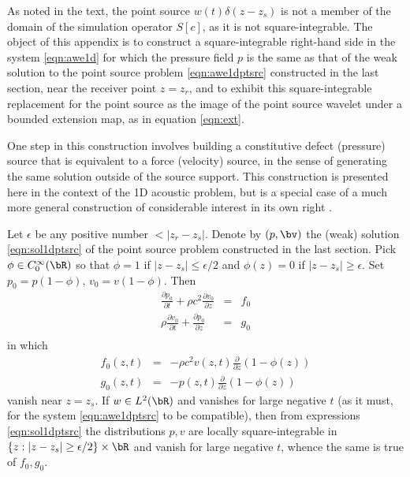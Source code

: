 
As noted in the text, the point source $w(t)\delta(z-z_s)$ is not a
member of the domain of the simulation operator $S[c]$, as it is not
square-integrable. The object of this appendix is to construct a square-integrable right-hand side in the
system \ref{eqn:awe1d} for which the pressure field $p$
is the same as that of the weak solution to the point source problem \ref{eqn:awe1dptsrc}
constructed in the last section, near the receiver point $z=z_r$, and
to exhibit this square-integrable replacement for the point source as
the image of the point source wavelet under a bounded extension map,
as in equation \ref{eqn:ext}.

One step in this construction involves building a constitutive defect
(pressure) source that is equivalent to a force (velocity) source, in the sense of generating the
same solution outside of the source support. This construction is
presented here in the context of the 1D acoustic problem, but is a
special case of a much more general construction of considerable
interest in its own right \cite[]{BurridgeKnopoff:64}.

Let
$\epsilon$ be any positive number $<|z_r-z_s|$. 
Denote by $(p,\bv)$ the (weak) solution \ref{eqn:sol1dptsrc} of the point source
problem constructed in the last section.
Pick $\phi \in C_0^{\infty}(\bR)$ so that
$\phi = 1$ if $|z-z_s| \le \epsilon/2$ and $\phi(z)=0$ if $|z-z_s|
\ge\epsilon$. Set $p_0=p(1-\phi)$, $v_0=v(1-\phi)$. Then
\begin{eqnarray}
\label{eqn:awecut}
\frac{\partial p_0}{\partial t} + \rho c^2 \frac{\partial
  v_0}{\partial z} &=&
                            f_0  \nonumber\\
\rho \frac{\partial v_0}{\partial t} +\frac{\partial p_0}{\partial z} &=& g_0 \nonumber\\
\end{eqnarray}
in which
\begin{eqnarray}
  \label{eqn:rhscut}
  f_0(z,t) &=& -\rho c^2 v(z,t) \frac{\partial}{\partial z}(1-\phi(z))\nonumber\\
  g_0(z,t) &=& -p(z,t) \frac{\partial}{\partial z}(1-\phi(z))
\end{eqnarray}
vanish near $z=z_s$. If $w \in L^2(\bR)$ and vanishes for large
negative $t$ (as it must, for the system \ref{eqn:awe1dptsrc} to be
compatible), then from expressions \ref{eqn:sol1dptsrc} the
distributions $p,v$ are locally square-integrable in
$\{z:|z-z_s| \ge \epsilon/2\} \times \bR$ and vanish for large
negative $t$, whence the same is true of $f_0,g_0$.

